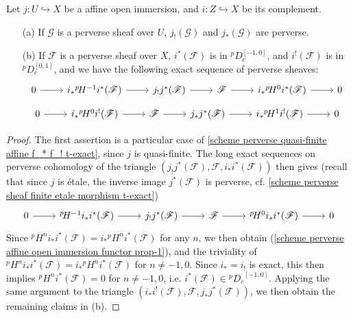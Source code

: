 \begin{corollary}\label{scheme perverse affine open immersion functor prop}
Let $j:U\hookrightarrow X$ be a affine open immersion, and $i:Z\hookrightarrow X$ be its complement. 
\begin{enumerate}
    \item[(a)] If $\mathscr{G}$ is a perverse sheaf over $U$, $j_!(\mathscr{G})$ and $j_*(\mathscr{G})$ are perverse.
    \item[(b)] If $\mathscr{F}$ is a perverse sheaf over $X$, $i^*(\mathscr{F})$ is in ${^p\!D_c^{[-1,0]}}$, and $i^!(\mathscr{F})$ is in ${^p\!D_c^{[0,1]}}$, and we have the following exact sequence of perverse sheaves:
    \begin{equation}\label{scheme perverse affine open immersion functor prop-1}
    \begin{tikzcd}
    0\ar[r]&i_*{^p\!H^{-1}}i^*(\mathscr{F})\ar[r]&j_!j^*(\mathscr{F})\ar[r]&\mathscr{F}\ar[r]&i_*{^p\!H^0}i^*(\mathscr{F})\ar[r]&0
    \end{tikzcd}
    \end{equation}
    \vspace*{-4mm}
    \begin{equation}\label{scheme perverse affine open immersion functor prop-2}
    \begin{tikzcd}
    0\ar[r]&i_*{^p\!H^{0}}i^!(\mathscr{F})\ar[r]&\mathscr{F}\ar[r]&j_*j^*(\mathscr{F})\ar[r]&i_*{^p\!H^1}i^!(\mathscr{F})\ar[r]&0
    \end{tikzcd}
    \end{equation}
\end{enumerate}
\end{corollary}
\begin{proof}
The first assertion is a particular case of \cref{scheme perverse quasi-finite affine f_* f_! t-exact}, since $j$ is quasi-finite. The long exact sequences on perverse cohomology of the triangle $(j_!j^*(\mathscr{F}),\mathscr{F},i_*i^*(\mathscr{F}))$ then gives (recall that since $j$ is \'etale, the inverse image $j^*(\mathscr{F})$ is perverse, cf. \cref{scheme perverse sheaf finite etale morphism t-exact})
\[\begin{tikzcd}
0\ar[r]&{^p\!H^{-1}}i_*i^*(\mathscr{F})\ar[r]&j_!j^*(\mathscr{F})\ar[r]&\mathscr{F}\ar[r]&{^p\!H^0}i_*i^*(\mathscr{F})\ar[r]&0
\end{tikzcd}\]
Since ${^p\!H^n}i_*i^*(\mathscr{F})=i_*{^p\!H^n}i^*(\mathscr{F})$ for any $n$, we then obtain (\ref{scheme perverse affine open immersion functor prop-1}), and the triviality of ${^p\!H^ni_*i^*(\mathscr{F})}=i_*{^p\!H^n}i^*(\mathscr{F})$ for $n\neq -1,0$. Since $i_*=i_!$ is exact, this then implies ${^p\!H^n}i^*(\mathscr{F})=0$ for $n\neq -1,0$, i.e. $i^*(\mathscr{F})\in {^p\!D_c}^{[-1,0]}$. Applying the same argument to the triangle $(i_*i^!(\mathscr{F}),\mathscr{F},j_*j^*(\mathscr{F}))$, we then obtain the remaining claims in (b).
\end{proof}

